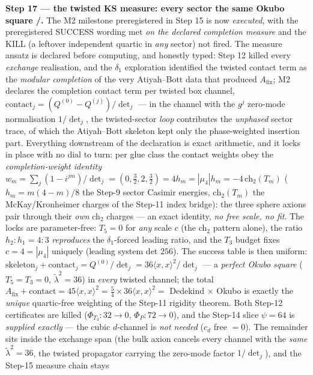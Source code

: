 \documentclass[11pt,a4paper]{article}
\theoremstyle{definition}
\begin{document}
\par\smallskip\noindent\textbf{Step 17 --- the twisted KS measure: every sector the same Okubo
square \mE/\mC.} The M2 milestone preregistered in Step 15 is now \emph{executed}, with the
preregistered SUCCESS wording met \emph{on the declared completion measure} and the KILL (a
leftover independent quartic in \emph{any} sector) not fired. The measure ansatz is declared
before computing, and honestly typed: Step 12 killed every \emph{exchange} realisation, and the
$\delta_1$ exploration identified the twisted contact term as the \emph{modular completion} of
the very Atiyah--Bott data that produced $A_{\mathrm{fix}}$; M2 declares the completion contact
term per twisted box channel, $\mathrm{contact}_j=(Q^{(0)}-Q^{(j)})/\det_j$ --- in the channel
with the $g^j$ zero-mode normalisation $1/\det_j$, the twisted-sector \emph{loop} contributes
the \emph{unphased} sector trace, of which the Atiyah--Bott skeleton kept only the
phase-weighted insertion part. Everything downstream of the declaration is exact arithmetic,
and it locks in place with no dial to turn: per glue class the contact weights obey the
\emph{completion-weight identity}
$w_m=\sum_j(1-i^{jm})/\det_j=(0,\tfrac32,2,\tfrac32)=4h_m=|\mu_4|h_m=-4\,\mathrm{ch}_2(T_m)$
($h_m=m(4-m)/8$ the Step-9 sector Casimir energies, $\mathrm{ch}_2(T_m)$ the McKay/Kronheimer
charges of the Step-11 index bridge): the three sphere axions pair through their \emph{own}
ch$_2$ charges --- an exact identity, \emph{no free scale, no fit}. The locks are
parameter-free: $T_5=0$ for \emph{any} scale $c$ (the ch$_2$ pattern alone), the ratio
$h_2{:}h_1=4{:}3$ \emph{reproduces} the $\delta_1$-forced leading ratio, and the $T_3$ budget
fixes $c=4=|\mu_4|$ uniquely (leading system det $256$). The success table is then uniform:
$\mathrm{skeleton}_j+\mathrm{contact}_j=Q^{(0)}/\det_j=36\langle x,x\rangle^2/\det_j$ --- a
\emph{perfect Okubo square} ($T_5=T_3=0$, $\tilde\lambda^2=36$) in \emph{every} twisted channel;
the total $A_{\mathrm{fix}}+\mathrm{contact}=45\langle x,x\rangle^2=\tfrac54\times36\langle
x,x\rangle^2=$ Dedekind $\times$ Okubo is exactly the \emph{unique} quartic-free weighting of
the Step-11 rigidity theorem. Both Step-12 certificates are killed ($\Phi_{T_3}\!:32\to0$,
$\Phi_P\!:72\to0$), and the Step-14 slice $\psi=64$ is \emph{supplied exactly} --- the cubic
$d$-channel is \emph{not needed} ($c_d$ free $=0$). The remainder sits inside the exchange span
(the bulk axion cancels every channel with the \emph{same} $\tilde\lambda^2=36$, the twisted
propagator carrying the zero-mode factor $1/\det_j$), and the Step-15 measure chain stays
\end{document}
